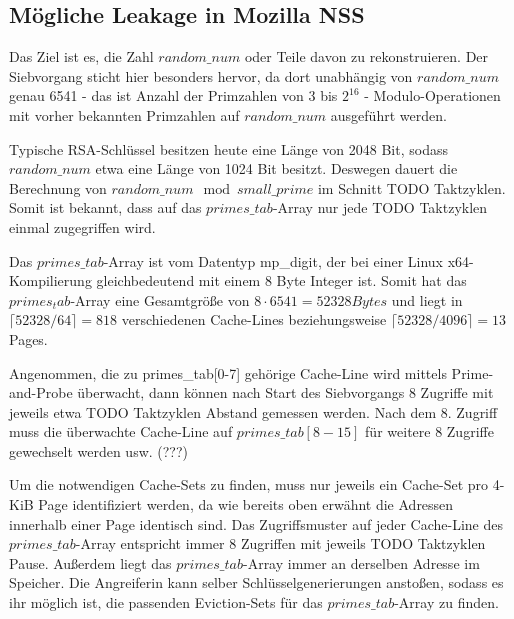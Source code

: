 \subsection{Mögliche Leakage in Mozilla NSS} 
\label{leakageMozillaNSS}

Das Ziel ist es, die Zahl $random\_num$ oder Teile davon zu rekonstruieren.
Der Siebvorgang sticht hier besonders hervor, da dort unabhängig von $random\_num$ genau 6541 - das ist Anzahl der Primzahlen von 3 bis $2^{16}$ - Modulo-Operationen mit vorher bekannten Primzahlen auf $random\_num$ ausgeführt werden.

Typische RSA-Schlüssel besitzen heute eine Länge von 2048 Bit, sodass $random\_num$ etwa eine Länge von 1024 Bit besitzt.
Deswegen dauert die Berechnung von $random\_num \mod small\_prime$ im Schnitt TODO Taktzyklen.
Somit ist bekannt, dass auf das $primes\_tab$-Array nur jede TODO Taktzyklen einmal zugegriffen wird.

Das $primes\_tab$-Array ist vom Datentyp mp_digit, der bei einer Linux x64-Kompilierung gleichbedeutend mit einem 8 Byte Integer ist.
Somit hat das $primes_tab$-Array eine Gesamtgröße von $8 \cdot 6541 = 52328 Bytes$ und liegt in $\lceil 52328 / 64 \rceil = 818$ verschiedenen Cache-Lines beziehungsweise $\lceil 52328 / 4096 \rceil = 13$ Pages.

Angenommen, die zu primes_tab[0-7] gehörige Cache-Line wird mittels Prime-and-Probe überwacht, dann können nach Start des Siebvorgangs 8 Zugriffe mit jeweils etwa TODO Taktzyklen Abstand gemessen werden.
Nach dem 8. Zugriff muss die überwachte Cache-Line auf $primes\_tab[8-15]$ für weitere 8 Zugriffe gewechselt werden usw. (???)

Um die notwendigen Cache-Sets zu finden, muss nur jeweils ein Cache-Set pro 4-KiB Page identifiziert werden, da wie bereits oben erwähnt die Adressen innerhalb einer Page identisch sind.
Das Zugriffsmuster auf jeder Cache-Line des $primes\_tab$-Array entspricht immer 8 Zugriffen mit jeweils TODO Taktzyklen Pause. Außerdem liegt das $primes\_tab$-Array immer an derselben Adresse im Speicher.
Die Angreiferin kann selber Schlüsselgenerierungen anstoßen, sodass es ihr möglich ist, die passenden Eviction-Sets für das $primes\_tab$-Array zu finden.

